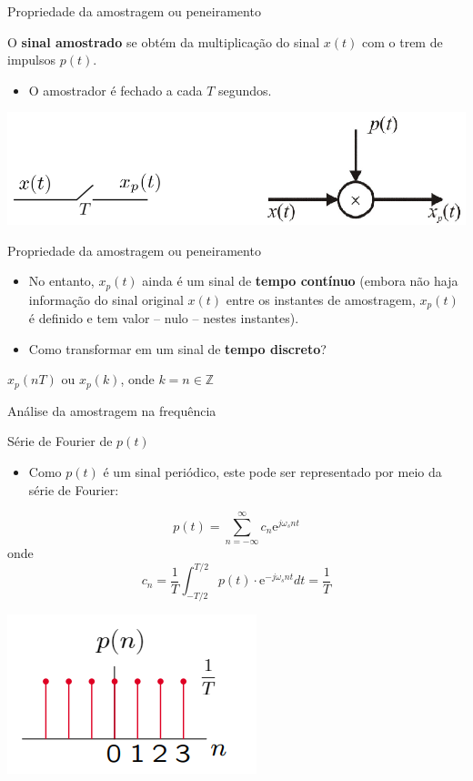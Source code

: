 \begin{frame}{Propriedade da amostragem ou peneiramento}
\begin{block}{}
O \textbf{sinal amostrado} se obtém da multiplicação do sinal $x(t)$ com o trem de impulsos $p(t)$.
\begin{itemize}
    \item O amostrador é fechado a cada $T$ segundos. 
\end{itemize}
\end{block}
\vspace{0.3cm}
\centerline{\includegraphics[width=0.9\linewidth]{Figuras/Ch02/fig7.PNG}}
\end{frame}

\begin{frame}{Propriedade da amostragem ou peneiramento}
\begin{block}{}
\begin{itemize}
    \item No entanto, $x_p(t)$ ainda é um sinal de \textbf{tempo contínuo} (embora não haja informação do sinal original $x(t)$ entre os instantes de amostragem, $x_p(t)$ é definido e tem valor -- nulo -- nestes instantes).
    \item Como transformar em um sinal de \textbf{tempo discreto}?
\end{itemize}
\begin{center}
$x_p(nT)$ ou $x_p(k)$, onde $k = n \in \mathbb{Z}$
\end{center}
\end{block}
\end{frame}

\begin{frame}{Análise da amostragem na frequência}
\begin{block}{Série de Fourier de $p(t)$}
\begin{itemize}
    \item Como $p(t)$ é um sinal periódico, este pode ser representado por meio da série de Fourier:
\end{itemize}
$$p(t) = \sum_{n=-\infty}^{\infty}c_n \text{e}^{j\omega_s nt}$$
onde
$$c_n = \dfrac{1}{T} \int_{-T/2}^{T/2} p(t) \cdot \text{e}^{-j\omega_s nt} dt = \dfrac{1}{T}$$
\end{block}
\centerline{\includegraphics[width=0.4\linewidth]{Figuras/Ch02/fig17.PNG}}
\end{frame}

